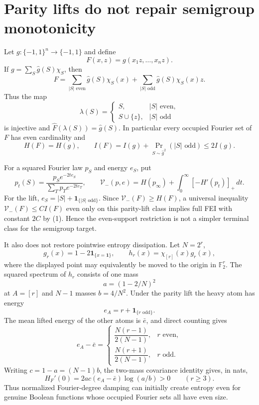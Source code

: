 \section*{Parity lifts do not repair semigroup monotonicity}

Let $g:\{-1,1\}^n\to\{-1,1\}$ and define
\[
 F(x,z)=g(x_1z,\ldots,x_nz).
\]
If $g=\sum_S\widehat g(S)\chi_S$, then
\[
 F=\sum_{|S|\text{ even}}\widehat g(S)\chi_S(x)
 +\sum_{|S|\text{ odd}}\widehat g(S)\chi_S(x)z.
\]
Thus the map
\[
 \lambda(S)=\begin{cases}S,&|S|\text{ even},\\
 S\cup\{z\},&|S|\text{ odd}
 \end{cases}
\]
is injective and $\widehat F(\lambda(S))=\widehat g(S)$.  In
particular every occupied Fourier set of $F$ has even cardinality and
\[
 H(F)=H(g),\qquad
 I(F)=I(g)+\Pr_{S\sim\widehat g^2}(|S|\text{ odd})\le 2I(g).
\tag{1}
\]

For a squared Fourier law $p_S$ and energy $e_S$, put
\[
 p_t(S)=\frac{p_Se^{-2te_S}}{\sum_Tp_Te^{-2te_T}},\qquad
 \mathcal V_-(p,e)=H(p_\infty)+\int_0^\infty[-H'(p_t)]_+\,dt.
\]
For the lift, $e_S=|S|+\mathbf1_{\{|S|\text{ odd}\}}$.  Since
$\mathcal V_-(F)\ge H(F)$, a universal inequality
$\mathcal V_-(F)\le C I(F)$ even only on this parity-lift class implies
full FEI with constant $2C$ by (1).  Hence the even-support restriction is
not a simpler terminal class for the semigroup target.

It also does not restore pointwise entropy dissipation.  Let $N=2^r$,
\[
 g_r(x)=1-2\mathbf1_{\{x=\mathbf1\}},\qquad
 h_r(x)=\chi_{[r]}(x)g_r(x),
\]
where the displayed point may equivalently be moved to the origin in
$\mathbb F_2^r$.  The squared spectrum of $h_r$ consists of one mass
\[
 a=(1-2/N)^2
\]
at $A=[r]$ and $N-1$ masses $b=4/N^2$.  Under the parity lift the heavy
atom has energy
\[
 e_A=r+\mathbf1_{\{r\text{ odd}\}}.
\]
The mean lifted energy of the other atoms is $\bar e$, and direct counting
gives
\[
 e_A-\bar e=
 \begin{cases}
 \dfrac{N(r-1)}{2(N-1)},&r\text{ even},\\[6pt]
 \dfrac{N(r+1)}{2(N-1)},&r\text{ odd}.
 \end{cases}
\tag{2}
\]
Writing $c=1-a=(N-1)b$, the two-mass covariance identity gives, in nats,
\[
 H_F'(0)=2ac(e_A-\bar e)\log(a/b)>0\qquad(r\ge3).
\tag{3}
\]
Thus normalized Fourier-degree damping can initially create entropy even
for genuine Boolean functions whose occupied Fourier sets all have even
size.

